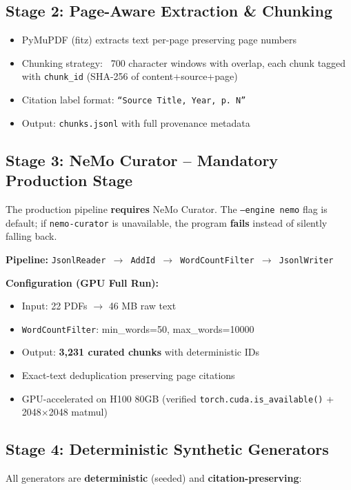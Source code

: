 \documentclass[11pt,a4paper]{article}
\begin{document}
\subsection{Stage 2: Page-Aware Extraction \& Chunking}
\begin{itemize}[label=\textcolor{nvidiaGreen}{$\triangleright$}, leftmargin=*]
    \item PyMuPDF (fitz) extracts text per-page preserving page numbers
    \item Chunking strategy: ~700 character windows with overlap, each chunk tagged with \texttt{chunk\_id} (SHA-256 of content+source+page)
    \item Citation label format: \texttt{``Source Title, Year, p. N''}
    \item Output: \texttt{chunks.jsonl} with full provenance metadata
\end{itemize}

\subsection{Stage 3: NeMo Curator -- Mandatory Production Stage}
\begin{nvidiabox}
The production pipeline \textbf{requires} NeMo Curator. The \texttt{--engine nemo} flag is default; if \texttt{nemo-curator} is unavailable, the program \textbf{fails} instead of silently falling back.

\medskip
\noindent\textbf{Pipeline:} \texttt{JsonlReader $\to$ AddId $\to$ WordCountFilter $\to$ JsonlWriter}

\medskip
\noindent\textbf{Configuration (GPU Full Run):}
\begin{itemize}[label=\textcolor{nvidiaGreen}{$\bullet$}, leftmargin=*]
    \item Input: 22 PDFs $\to$ 46 MB raw text
    \item \texttt{WordCountFilter}: min\_words=50, max\_words=10000
    \item Output: \textbf{3,231 curated chunks} with deterministic IDs
    \item Exact-text deduplication preserving page citations
    \item GPU-accelerated on H100 80GB (verified \texttt{torch.cuda.is\_available()} + 2048$\times$2048 matmul)
\end{itemize}
\end{nvidiabox}

\subsection{Stage 4: Deterministic Synthetic Generators}
All generators are \textbf{deterministic} (seeded) and \textbf{citation-preserving}:
\end{document}
